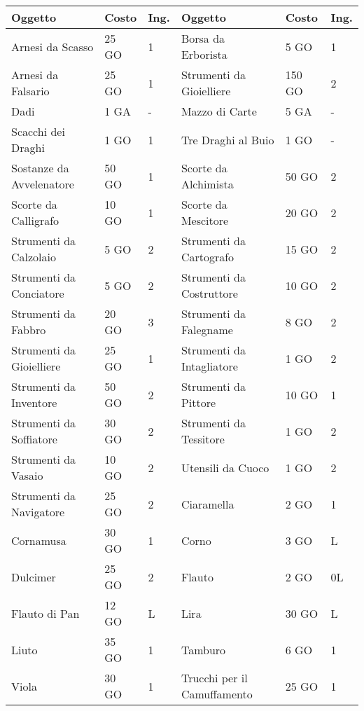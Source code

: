 \documentclass[12pt,a4paper,twoside,openany]{book}
\begin{document}
\begin{tabularx}{0.95\textwidth}{llX|llX}
\textbf{Oggetto}&\textbf{Costo}&\textbf{Ing.}&\textbf{Oggetto}&\textbf{Costo}&\textbf{Ing.}\\
\toprule
Arnesi da Scasso&25 GO&1&Borsa da Erborista&5 GO&1\\
Arnesi da Falsario&25 GO&1&Strumenti da Gioielliere&150 GO&2\\
Dadi&1 GA&-&Mazzo di Carte&5 GA&-\\
Scacchi dei Draghi&1 GO&1&Tre Draghi al Buio&1 GO&-\\
Sostanze da Avvelenatore&50 GO&1&Scorte da Alchimista&50 GO&2\\
Scorte da Calligrafo&10 GO&1&Scorte da Mescitore&20 GO&2\\
Strumenti da Calzolaio&5 GO&2&Strumenti da Cartografo&15 GO&2\\
Strumenti da Conciatore&5 GO&2&Strumenti da Costruttore&10 GO&2\\
Strumenti da Fabbro&20 GO&3&Strumenti da Falegname&8 GO&2\\
Strumenti da Gioielliere&25 GO&1&Strumenti da Intagliatore&1 GO&2\\
Strumenti da Inventore&50 GO&2&Strumenti da Pittore&10 GO&1\\
Strumenti da Soffiatore&30 GO&2&Strumenti da Tessitore&1 GO&2\\
Strumenti da Vasaio&10 GO&2&Utensili da Cuoco&1 GO&2\\
Strumenti da Navigatore&25 GO&2&Ciaramella&2 GO&1\\
Cornamusa&30 GO&1&Corno&3 GO&L\\
Dulcimer&25 GO&2&Flauto&2 GO&0L\\
Flauto di Pan&12 GO&L&Lira&30 GO&L\\
Liuto&35 GO&1&Tamburo&6 GO&1\\
Viola&30 GO&1&Trucchi per il Camuffamento&25 GO&1\\
\end{tabularx}
\end{document}
